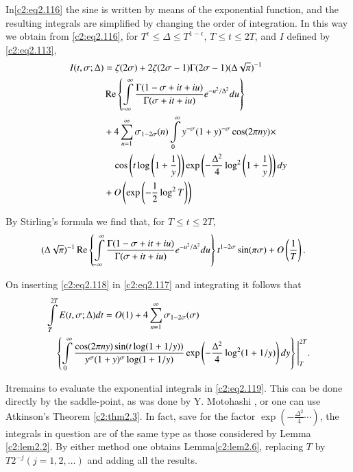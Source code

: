 In\pageoriginale \eqref{c2:eq2.116} the sine is written by means of the exponential
function, and the resulting integrals are simplified by changing the
order of integration. In this way we obtain from \eqref{c2:eq2.116},
for $T^\epsilon \leq \Delta  \leq T^{1- \epsilon}$, $T\leq t \leq
2T$, and $I$ defined by \eqref{c2:eq2.113},
\begin{align}
I (t, \sigma; \Delta ) & = \zeta (2 \sigma)+ 2 \zeta (2 \sigma -1) \Gamma (2 \sigma -1)
(\Delta \sqrt{\pi})^{-1} \notag\\
&\operatorname{Re}\left\{ \int\limits_{-
\infty}^\infty \frac{\Gamma (1- \sigma + it + iu)}{\Gamma (\sigma
+ it + iu)} e^{- u^2/\Delta ^2}du \right\}\notag\\
&+ 4 \sum_{n=1}^{\infty} \sigma_{1- 2 \sigma}(n) \int\limits_0^\infty
y^{- \sigma} (1+ y)^{-\sigma} \cos (2 \pi ny)\times\notag\\
&\quad\cos \left(t \log \left( 1+ \frac{1}{y}\right)\right)\exp \left(- \frac{\Delta ^2}{4}
\log^2 \left(1+ \frac{1}{y} \right)\right)dy\notag\\
& + O \left(\exp \left(-
\frac{1}{2} \log ^2 T \right)\right)\label{c2:eq2.117}
\end{align}

By Stirling's formula we find that, for $T \leq t \leq 2T$,
\begin{align}
  (\Delta  \sqrt{\pi})^{-1} \operatorname{Re} & \left\{ \int\limits_{-
    \infty}^\infty \frac{\Gamma (1- \sigma + it + iu)}{\Gamma (\sigma
    + it + iu)} e^{-u^2/\Delta ^2}du\right\}
   t^{1-2\sigma} \sin(\pi \sigma) + O\left(\frac{1}{T}
   \right).\label{c2:eq2.118} 
\end{align}

On inserting \eqref{c2:eq2.118} in \eqref{c2:eq2.117} and integrating
it follows that 
\begin{align}
&\int\limits_T^{2T} E(t, \sigma ; \Delta ) dt=
O(1)+ 4 \sum_{n=1}^\infty \sigma_{1- 2 \sigma}
(\sigma) \label{c2:eq2.119}\\  
&\quad\left\{\int\limits_{0}^\infty \frac{\cos (2 \pi n y) \sin (t \log (1+
1/y))}{y^\sigma (1+y)^\sigma \log (1+ 1/y)} \exp \left( -
\frac{\Delta ^2}{4} \log^2 (1+ 1 /y)\right) dy \right\}
\Bigg|_T^{2T}.\notag 
\end{align}

It\pageoriginale remains to evaluate the exponential integrals in
\eqref{c2:eq2.119}. This can be done directly by the saddle-point, as
was done by Y. Motohashi \cite{Motohashi8}, or one can use Atkinson's Theorem
\ref{c2:thm2.3}. In fact, save for the factor $\exp \left( -
\frac{\Delta ^2}{4} \cdots\right)$, the integrals in question are of
the same type as those considered by Lemma \ref{c2:lem2.2}. By either
method one obtains Lemma\ref{c2:lem2.6}, replacing $T$ by $T2^{-j} (j=
1, 2, \ldots)$ and adding all the results.

